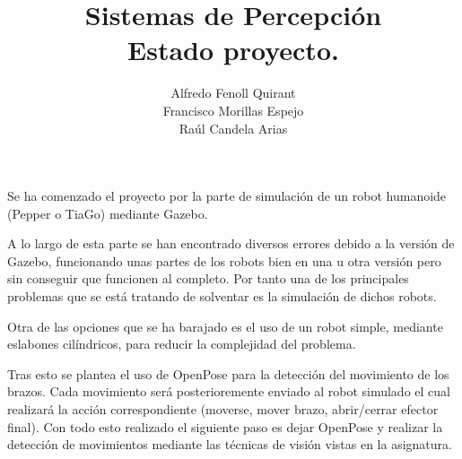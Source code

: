\documentclass[12pt, a4paper]{article}
\title{\huge Sistemas de Percepción\\ \LARGE Estado proyecto.}
\author{Alfredo Fenoll Quirant \\Francisco Morillas Espejo \\ Raúl Candela Arias}
\date{}
\begin{document}
Se ha comenzado el proyecto por la parte de simulación de un robot humanoide (Pepper o TiaGo) mediante Gazebo.
\newline

A lo largo de esta parte se han encontrado diversos errores debido a la versión de Gazebo, funcionando unas partes de los robots bien en una u otra versión pero sin conseguir que funcionen al completo.
Por tanto una de los principales problemas que se está tratando de solventar es la simulación de dichos robots.
\newline

Otra de las opciones que se ha barajado es el uso de un robot simple, mediante eslabones cilíndricos, para reducir la complejidad del problema.
\newline

Tras esto se plantea el uso de OpenPose para la detección del movimiento de los brazos.
Cada movimiento será posterioremente enviado al robot simulado el cual realizará la acción correspondiente (moverse, mover brazo, abrir/cerrar efector final).
Con todo esto realizado el siguiente paso es dejar OpenPose y realizar la detección de movimientos mediante las técnicas de visión vistas en la asignatura.
 
\end{document}
